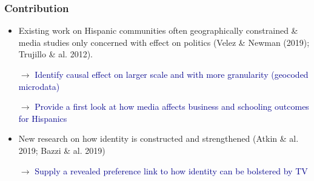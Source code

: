 \documentclass{beamer}
\begin{document}
%
\begin{frame}
\frametitle{Contribution}
\begin{itemize}

\item Existing work on Hispanic communities often geographically constrained \& media studies only concerned with effect on politics  {\footnotesize (Velez \& Newman (2019); Trujillo \& al. 2012)}. 
\item[$\rightarrow $] \textcolor{darkblue}{Identify causal effect on larger scale and with more granularity (geocoded microdata)}

\item[$\rightarrow $] \textcolor{darkblue}{Provide a first look at how media affects business and schooling outcomes for Hispanics}

\item New research on how identity is constructed and strengthened {\footnotesize (Atkin \& al. 2019; Bazzi \& al. 2019)}

\item[$\rightarrow $] \textcolor{darkblue}{Supply a revealed preference link to how identity can be bolstered by TV}

\end{itemize}

\end{frame}
\end{document}
